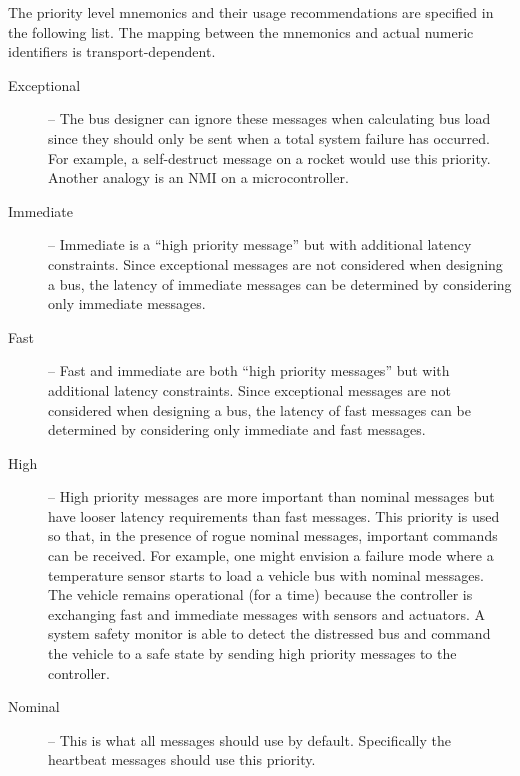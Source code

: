 \begin{remark}[breakable]
    The priority level mnemonics and their usage recommendations are specified in the following list.
    The mapping between the mnemonics and actual numeric identifiers is transport-dependent.

    \begin{description}
        \item[Exceptional] -- The bus designer can ignore these messages when calculating bus load since they
        should only be sent when a total system failure has occurred.
        For example, a self-destruct message on a rocket would use this priority.
        Another analogy is an NMI on a microcontroller.

        \item[Immediate] -- Immediate is a ``high priority message'' but with additional latency constraints.
        Since exceptional messages are not considered when designing a bus, the latency of immediate messages
        can be determined by considering only immediate messages.

        \item[Fast] -- Fast and immediate are both ``high priority messages'' but with additional latency constraints.
        Since exceptional messages are not considered when designing a bus,
        the latency of fast messages can be determined by considering only immediate and fast messages.

        \item[High] -- High priority messages are more important than nominal messages but have looser
        latency requirements than fast messages. This priority is used so that,
        in the presence of rogue nominal messages, important commands can be received.
        For example, one might envision a failure mode where a temperature sensor starts to
        load a vehicle bus with nominal messages.
        The vehicle remains operational (for a time) because the controller is exchanging fast and
        immediate messages with sensors and actuators.
        A system safety monitor is able to detect the distressed bus and command the vehicle to a
        safe state by sending high priority messages to the controller.

        \item[Nominal] -- This is what all messages should use by default.
        Specifically the heartbeat messages should use this priority.


\end{description}
\end{remark}
